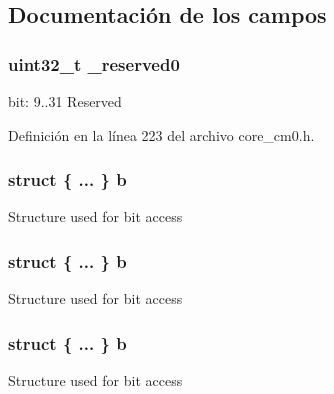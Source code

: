 \subsection{Documentación de los campos}
\subsubsection[{\texorpdfstring{\+\_\+reserved0}{_reserved0}}]{\setlength{\rightskip}{0pt plus 5cm}uint32\+\_\+t \+\_\+reserved0}\hypertarget{union_i_p_s_r___type_ac8a6a13838a897c8d0b8bc991bbaf7c1}{}\label{union_i_p_s_r___type_ac8a6a13838a897c8d0b8bc991bbaf7c1}
bit\+: 9..31 Reserved 

Definición en la línea 223 del archivo core\+\_\+cm0.\+h.

\subsubsection[{\texorpdfstring{b}{b}}]{\setlength{\rightskip}{0pt plus 5cm}struct \{ ... \}   b}\hypertarget{union_i_p_s_r___type_a3758147356a15906221a5625a27d9048}{}\label{union_i_p_s_r___type_a3758147356a15906221a5625a27d9048}
Structure used for bit access 
\subsubsection[{\texorpdfstring{b}{b}}]{\setlength{\rightskip}{0pt plus 5cm}struct \{ ... \}   b}\hypertarget{union_i_p_s_r___type_a77bc2e3569776643bbcd77a7b2bc69c3}{}\label{union_i_p_s_r___type_a77bc2e3569776643bbcd77a7b2bc69c3}
Structure used for bit access 
\subsubsection[{\texorpdfstring{b}{b}}]{\setlength{\rightskip}{0pt plus 5cm}struct \{ ... \}   b}\hypertarget{union_i_p_s_r___type_ac084c51939b6ba8158a34b784e88a14b}{}\label{union_i_p_s_r___type_ac084c51939b6ba8158a34b784e88a14b}
Structure used for bit access 
